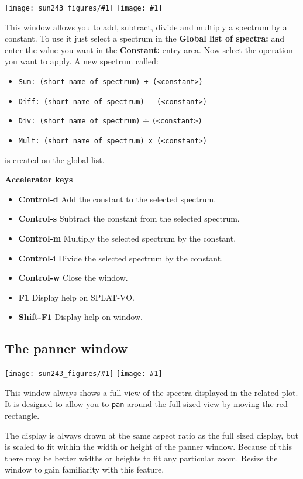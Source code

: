 \documentclass[twoside,11pt,nolof]{starlink}
\providecommand{\SPLAT}{\textsf{SPLAT-VO}}
\providecommand{\mainfigure}[1]
{\begin{center}
    \ifpdf
    \texttt{[image: sun243\_figures/\#1]}
    \else
    \texttt{[image: \#1]}
    \fi
 \end{center}
}
\newcommand{\labelitem}[1]{\textbf{#1}}
\providecommand{\hitext}[1]{\texttt{#1}}
\providecommand{\subheading}[1]{\textbf{\large{#1}}}
\begin{document}
\mainfigure{unarymathwindow}

This window allows you to add, subtract, divide and multiply a
spectrum by a constant. To use it just select a spectrum in the
\labelitem{Global list of spectra:} and enter the value you want in
the \labelitem{Constant:} entry area.
Now select the operation you want to apply. A new spectrum called:
\begin{itemize}
  \item \hitext{Sum: (short name of spectrum) + (<constant>)}
  \item \hitext{Diff: (short name of spectrum) - (<constant>)}
  \item \hitext{Div: (short name of spectrum)} $\div$ \hitext{(<constant>)}
  \item \hitext{Mult: (short name of spectrum) x (<constant>)}
\end{itemize}
is created on the global list.

\subheading{Accelerator keys}

\begin{itemize}
\item \labelitem{Control-d} Add the constant to the selected spectrum.
\item \labelitem{Control-s} Subtract the constant from the selected spectrum.
\item \labelitem{Control-m} Multiply the selected spectrum by the constant.
\item \labelitem{Control-i} Divide the selected spectrum by the constant.
\item \labelitem{Control-w} Close the window.
\item \labelitem{F1} Display help on \SPLAT.
\item \labelitem{Shift-F1} Display help on window.
\end{itemize}

\newpage
\subsection{The panner window}

\mainfigure{pannerwindow}

This window always shows a full view of the spectra displayed in
the related plot. It is designed to allow you to \hitext{pan} around
the full sized view by moving the red rectangle.

The display is always drawn at the same aspect ratio as the full sized
display, but is scaled to fit within the width or height of the panner
window. Because of this there may be better widths or heights to fit
any particular zoom. Resize the window to gain familiarity with this
feature.
\end{document}

